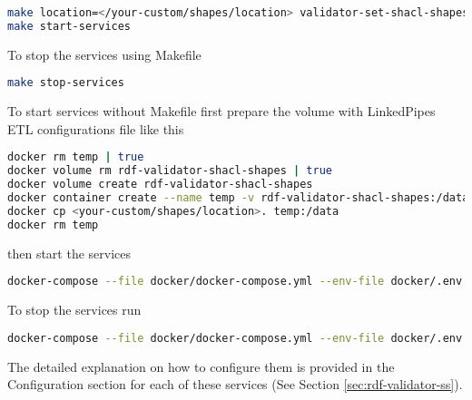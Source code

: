 \begin{lstlisting}[language=bash,]
make location=</your-custom/shapes/location> validator-set-shacl-shapes
make start-services
\end{lstlisting}

To stop the services using Makefile

\begin{lstlisting}[language=bash,]
make stop-services
\end{lstlisting}

To start services without Makefile first prepare the volume with LinkedPipes ETL configurations file like this

\begin{lstlisting}[language=bash,]
docker rm temp | true
docker volume rm rdf-validator-shacl-shapes | true
docker volume create rdf-validator-shacl-shapes
docker container create --name temp -v rdf-validator-shacl-shapes:/data busybox
docker cp <your-custom/shapes/location>. temp:/data
docker rm temp
\end{lstlisting}

then start the services

\begin{lstlisting}[language=bash,]
docker-compose --file docker/docker-compose.yml --env-file docker/.env up -d
\end{lstlisting}

To stop the services run

\begin{lstlisting}[language=bash,]
docker-compose --file docker/docker-compose.yml --env-file docker/.env down
\end{lstlisting}

The detailed explanation on how to configure them is provided in the Configuration section for each of these services (See Section \ref{sec:rdf-validator-ss}).
